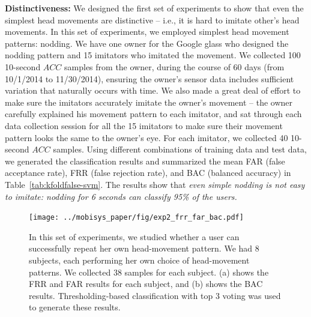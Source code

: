 \vspace{4pt}\textbf{Distinctiveness:} We designed the first set of experiments to show that even the simplest head movements are distinctive -- i.e., it is hard to imitate other's head movements. In this set of experiments, we employed simplest head movement patterns: nodding. We have one owner for the Google glass who designed the nodding pattern and 15 imitators who imitated the movement. We collected 100 10-second $ACC$ samples from the owner, during the course of 60 days (from 10/1/2014 to 11/30/2014), ensuring the owner's sensor data includes sufficient variation that naturally occurs with time. We also made a great deal of effort to make sure the imitators accurately imitate the owner's movement -- the owner carefully explained his movement pattern to each imitator, and sat through each data collection session for all the 15 imitators to make sure their movement pattern looks the same to the owner's eye. For each imitator, we collected 40 10-second $ACC$ samples. Using different combinations of training data and test data, we generated the classification results and summarized the mean FAR (false acceptance rate), FRR (false rejection rate), and BAC (balanced accuracy) in Table~\ref{tab:kfoldfalse-svm}. The results show that \emph{even simple nodding is not easy to imitate: nodding for 6 seconds can classify 95\% of the users.} %

\begin{figure}[t]
\centering
\texttt{[image: ../mobisys\_paper/fig/exp2\_frr\_far\_bac.pdf]}
\caption{In this set of experiments, we studied whether a user can successfully repeat her own head-movement pattern. We had 8 subjects, each performing her own choice of head-movement patterns. We collected 38 samples for each subject. (a) shows the FRR and FAR results for each subject, and (b) shows the BAC results. Thresholding-based classification with top 3 voting was used to generate these results. \label{fig:exp2_frr_far_bac}}
\end{figure}

